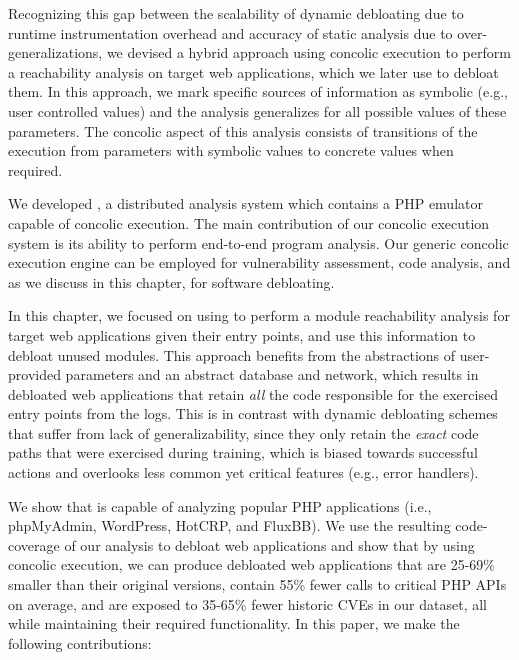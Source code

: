 Recognizing this gap between the scalability of dynamic debloating due to runtime instrumentation overhead and accuracy of static analysis due to over-generalizations, we devised a hybrid approach using concolic execution to perform a reachability analysis on target web applications, which we later use to debloat them. 
In this approach, we mark specific sources of information as symbolic (e.g., user controlled values) and the analysis generalizes for all possible values of these parameters. 
The concolic aspect of this analysis consists of transitions of the execution from parameters with symbolic values to concrete values when required. 

We developed \animatedead{}, a distributed analysis system which contains a PHP emulator capable of concolic execution. 
The main contribution of our concolic execution system is its ability to perform end-to-end program analysis. 
Our generic concolic execution engine can be employed for vulnerability assessment, code analysis, and as we discuss in this chapter, for software debloating. 

In this chapter, we focused on using \animatedead{} to perform a module reachability analysis for target web applications given their entry points, and use this information to debloat unused modules. 
This approach benefits from the abstractions of user-provided parameters and an abstract database and network, which results in debloated web applications that retain \emph{all} the code responsible for the exercised entry points from the logs. 
This is in contrast with dynamic debloating schemes that suffer from lack of generalizability, since they only retain the \emph{exact} code paths that were exercised during training, which is biased towards successful actions and overlooks less common yet critical features (e.g., error handlers). 

We show that \animatedead{} is capable of analyzing popular PHP applications (i.e., phpMyAdmin, WordPress, HotCRP, and FluxBB). 
We use the resulting code-coverage of our analysis to debloat web applications and show that by using concolic execution, we can produce debloated web applications that are 25-69\% smaller than their original versions, contain 55\% fewer calls to critical PHP APIs on average, and are exposed to 35-65\% fewer historic CVEs in our dataset, all while maintaining their required functionality. 
In this paper, we make the following contributions:

